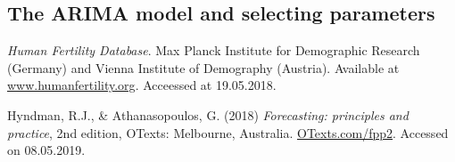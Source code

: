 \documentclass[a4paper, 12pt]{scrartcl}
\begin{document}
\subsection{The ARIMA model and selecting parameters}

\begin{thebibliography}{2}
	 \emph{Human Fertility Database}. Max Planck Institute for Demographic Research (Germany) and Vienna Institute of Demography (Austria). Available at \href{www.humanfertility.org}{www.humanfertility.org}. Acceessed at 19.05.2018.
	
	 Hyndman, R.J., \& Athanasopoulos, G. (2018) \emph{Forecasting: principles and practice}, 2nd edition, OTexts: Melbourne, Australia. \href{https://otexts.com/fpp2/}{OTexts.com/fpp2}. Accessed on 08.05.2019.
\end{thebibliography}
\end{document}
